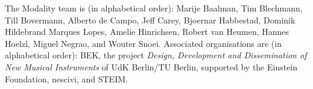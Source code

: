 \documentclass{article}
\begin{document}
\begin{acknowledgments}
The Modality team is (in alphabetical order):
    Marije Baalman,
	Tim Blechmann,
    Till Bovermann,
    Alberto de Campo,
    Jeff Carey,
    Bjoernar Habbestad,
	Dominik Hildebrand Marques Lopes,
	Amelie Hinrichsen,
    Robert van Heumen,
    Hannes Hoelzl,
    Miguel Negrao, and
    Wouter Snoei.
Associated organisations are (in alphabetical order):
BEK,
the project \emph{Design, Development and Dissemination of New Musical Instruments} of UdK Berlin/TU Berlin, supported by the Einstein Foundation,
nescivi, and
STEIM.

\end{acknowledgments} 


\end{document}
